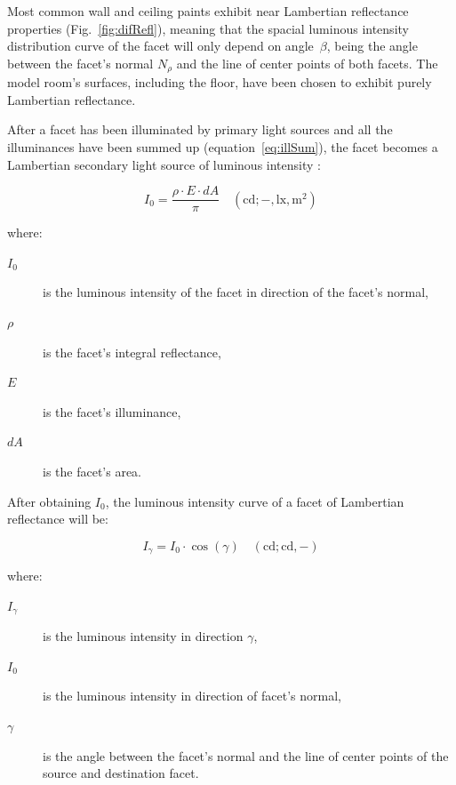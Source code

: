 Most common wall and ceiling paints exhibit near Lambertian reflectance properties (Fig.~\ref{fig:difRefl}), meaning that the spacial luminous intensity distribution curve of the facet will only depend on angle~$\beta$, being the angle between the facet's normal $N_{\rho}$ and the line of center points of both facets. The model room's surfaces, including the floor, have been chosen to exhibit purely Lambertian reflectance.

After a facet has been illuminated by primary light sources and all the illuminances have been summed up (equation~\ref{eq:illSum}), the facet becomes a Lambertian secondary light source of luminous intensity \cite{Habel}:

\begin{equation}
I_{0}=\frac{\rho \cdot E \cdot dA}{\pi} \quad \mathrm{(cd;-,lx,m^{2})}
\label{eq:lumInt}
\end{equation}

where:
\begin{description}
	\item[$I_{0}$] is the luminous intensity of the facet in direction of the facet's normal,
	\item[$\rho$] is the facet's integral reflectance,
	\item[$E$] is the facet's illuminance,
	\item[$dA$] is the facet's area.
\end{description}

After obtaining $I_{0}$, the luminous intensity curve of a facet of Lambertian reflectance will be:

\begin{equation}
I_{\gamma}=I_{0} \cdot \cos(\gamma) \quad \mathrm{(cd;cd,-)}
\end{equation}

where:
\begin{description}
	\item[$I_{\gamma}$] is the luminous intensity in direction $\gamma$,
	\item[$I_{0}$] is the luminous intensity in direction of facet's normal,
	\item[$\gamma$] is the angle between the facet's normal and the line of center points of the source and destination facet.
\end{description}